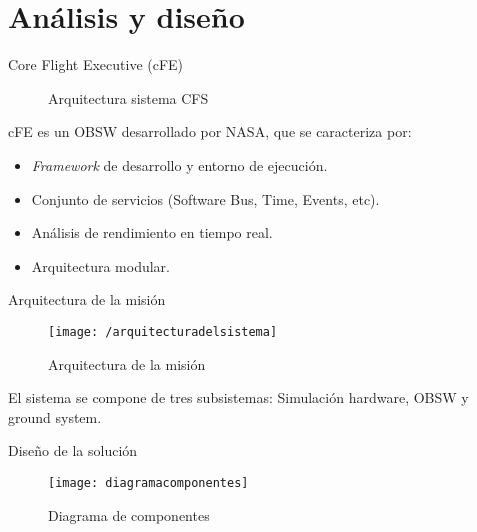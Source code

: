\section{Análisis y diseño}


\begin{frame}{Core Flight Executive (cFE)}

\begin{figure}
\center
{}
\caption{Arquitectura sistema CFS}

\end{figure}

cFE es un OBSW desarrollado por NASA, que se caracteriza por:

\begin{itemize}
\item \emph{Framework} de desarrollo y entorno de ejecución.
\item Conjunto de servicios (Software Bus, Time, Events, etc).
\item Análisis de rendimiento en tiempo real.
\item Arquitectura modular.
\end{itemize}

\end{frame}



\begin{frame}{Arquitectura de la misión}

\begin{figure}
\centering
\texttt{[image: /arquitecturadelsistema]}
\caption{Arquitectura de la misión}
\end{figure}

El sistema se compone de tres subsistemas:  Simulación hardware, OBSW y ground system.

\end{frame}



\begin{frame}{Diseño de la solución}

\begin{figure}[h]
\centering
\texttt{[image: diagramacomponentes]}
\caption{Diagrama de componentes}
\end{figure}

\end{frame}
